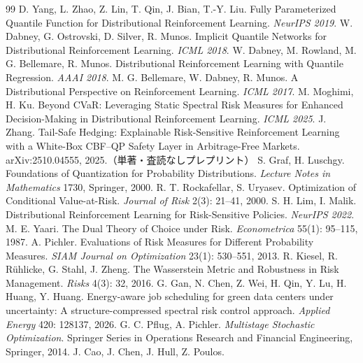 \documentclass[a4paper,10pt]{jsarticle}
\theoremstyle{definition}
\begin{document}
\begin{thebibliography}{99}
 D. Yang, L. Zhao, Z. Lin, T. Qin, J. Bian, T.-Y. Liu.
Fully Parameterized Quantile Function for Distributional Reinforcement Learning. \textit{NeurIPS 2019}.
 W. Dabney, G. Ostrovski, D. Silver, R. Munos.
Implicit Quantile Networks for Distributional Reinforcement Learning. \textit{ICML 2018}.
 W. Dabney, M. Rowland, M. G. Bellemare, R. Munos.
Distributional Reinforcement Learning with Quantile Regression. \textit{AAAI 2018}.
 M. G. Bellemare, W. Dabney, R. Munos.
A Distributional Perspective on Reinforcement Learning. \textit{ICML 2017}.
 M. Moghimi, H. Ku.
Beyond CVaR: Leveraging Static Spectral Risk Measures for Enhanced Decision-Making in Distributional Reinforcement Learning. \textit{ICML 2025}.
 J. Zhang.
Tail-Safe Hedging: Explainable Risk-Sensitive Reinforcement Learning with a White-Box CBF--QP Safety Layer in Arbitrage-Free Markets.
arXiv:2510.04555, 2025.（単著・査読なしプレプリント）
 S. Graf, H. Luschgy.
Foundations of Quantization for Probability Distributions. \textit{Lecture Notes in Mathematics} 1730, Springer, 2000.
 R. T. Rockafellar, S. Uryasev.
Optimization of Conditional Value-at-Risk. \textit{Journal of Risk} 2(3): 21--41, 2000.
 S. H. Lim, I. Malik.
Distributional Reinforcement Learning for Risk-Sensitive Policies. \textit{NeurIPS 2022}.
 M. E. Yaari.
The Dual Theory of Choice under Risk. \textit{Econometrica} 55(1): 95--115, 1987.
 A. Pichler.
Evaluations of Risk Measures for Different Probability Measures. \textit{SIAM Journal on Optimization} 23(1): 530--551, 2013.
 R. Kiesel, R. R{\"u}hlicke, G. Stahl, J. Zheng.
The Wasserstein Metric and Robustness in Risk Management. \textit{Risks} 4(3): 32, 2016.
 G. Gan, N. Chen, Z. Wei, H. Qin, Y. Lu, H. Huang, Y. Huang.
Energy-aware job scheduling for green data centers under uncertainty: A structure-compressed spectral risk control approach. \textit{Applied Energy} 420: 128137, 2026.
 G. C. Pflug, A. Pichler.
\textit{Multistage Stochastic Optimization}. Springer Series in Operations Research and Financial Engineering, Springer, 2014.
 J. Cao, J. Chen, J. Hull, Z. Poulos.

\end{thebibliography}
\end{document}
